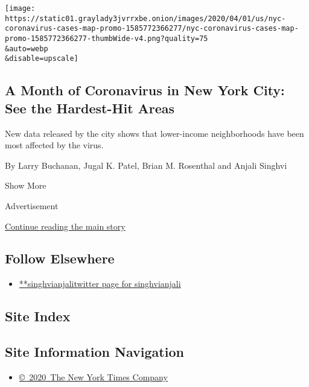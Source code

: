 \begin{enumerate}
  \texttt{[image: https://static01.graylady3jvrrxbe.onion/images/2020/04/01/us/nyc-coronavirus-cases-map-promo-1585772366277/nyc-coronavirus-cases-map-promo-1585772366277-thumbWide-v4.png?quality=75\\\&auto=webp\\\&disable=upscale]}

  \hypertarget{a-month-of-coronavirus-in-new-york-city-see-the-hardest-hit-areas}{%
  \subsection{A Month of Coronavirus in New York City: See the
  Hardest-Hit
  Areas}\label{a-month-of-coronavirus-in-new-york-city-see-the-hardest-hit-areas}}

  New data released by the city shows that lower-income neighborhoods
  have been most affected by the virus.

  By Larry Buchanan, Jugal K. Patel, Brian M. Rosenthal and Anjali
  Singhvi
\end{enumerate}

Show More

Advertisement

\protect\hyperlink{after-mid2}{Continue reading the main story}

\hypertarget{follow-elsewhere}{%
\subsection{Follow Elsewhere}\label{follow-elsewhere}}

\begin{itemize}
\tightlist
\item
  \href{https://twitter.com/singhvianjali}{**singhvianjalitwitter page
  for singhvianjali}
\end{itemize}

\hypertarget{site-index}{%
\subsection{Site Index}\label{site-index}}

\hypertarget{site-information-navigation}{%
\subsection{Site Information
Navigation}\label{site-information-navigation}}

\begin{itemize}
\tightlist
\item
  \href{https://help.nytimes3xbfgragh.onion/hc/en-us/articles/115014792127-Copyright-notice}{©~2020~The
  New York Times Company}
\end{itemize}

